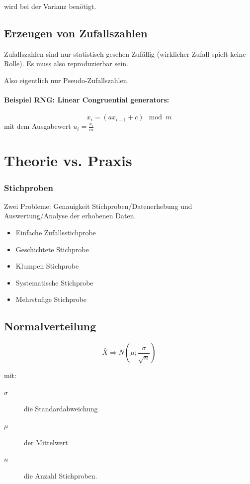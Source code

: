 wird bei der Varianz benötigt.

\subsection{Erzeugen von Zufallszahlen}

Zufallszahlen sind nur statistisch gesehen Zufällig (wirklicher Zufall spielt keine Rolle). Es muss also reproduzierbar sein.

Also eigentlich nur Pseudo-Zufallszahlen.

\paragraph{Beispiel RNG: Linear Congruential generators:}
\[
	x_i = (a x_{i-1} + c) \mod m
\]
mit dem Ausgabewert $u_i = \frac{x_i}{m}$

\section{Theorie vs. Praxis}

\subsubsection{Stichproben}

Zwei Probleme: Genauigkeit Stichproben/Datenerhebung und Auswertung/Analyse der erhobenen Daten.

\begin{itemize}
	\item	Einfache Zufallsstichprobe
	\item	Geschichtete Stichprobe
	\item	Klumpen Stichprobe
	\item	Systematische Stichprobe
	\item	Mehrstufige Stichprobe
\end{itemize}

\subsection{Normalverteilung}

\[
\bar{X} \Rightarrow N\left(\mu; \frac{\sigma}{\sqrt{n}}\right)
\]

mit:
\begin{description}
	\item[$\sigma$] die Standardabweichung
	\item[$\mu$] der Mittelwert
	\item[$n$] die Anzahl Stichproben.
\end{description}

